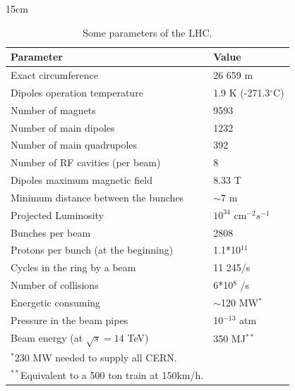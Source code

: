 \begin{table}[htbp]{15cm}
\caption{Some parameters of the LHC.}
\begin{tabular}{p{10cm}p{4cm}}
\hline \hline
Parameter									&	Value					    \\
\hline
Exact circumference						    &	26 659 m					\\
Dipoles operation temperature 			    &	1.9 K (-271.3$^{\circ}$C)	\\
Number of magnets                           &	9593						\\
Number of main dipoles          			&	1232						\\
Number of main quadrupoles                  &	392							\\
Number of RF cavities (per beam)			&	8        					\\
Dipoles maximum magnetic field  			&	8.33 T						\\
Minimum distance between the bunches 		&	$\sim$7 m					\\
Projected Luminosity 						&	$10^{34}$ cm$^{-2}s^{-1}$	\\
Bunches per beam 					        &	2808						\\
Protons per bunch (at the beginning)        &	1.1*10$^{11}$				\\
Cycles in the ring by a beam    			&	11 245/s					\\
Number of collisions						&	6*10$^{8}$ /s		        \\
Energetic consuming						    &	$\sim$120 MW$^{*}$			\\
Pressure in the beam pipes          		&	10$^{-13}$ atm				\\
Beam energy        (at $\sqrt{s} = 14$ TeV)	&	350 MJ$^{**}$				\\
\hline
$^{*}$230 MW needed to supply all CERN.		&								\\
$^{**}$Equivalent to a 500 ton train at 150km/h. &					\\
\hline
\end{tabular}
\label{tab:lhc_parameters}
\end{table}


